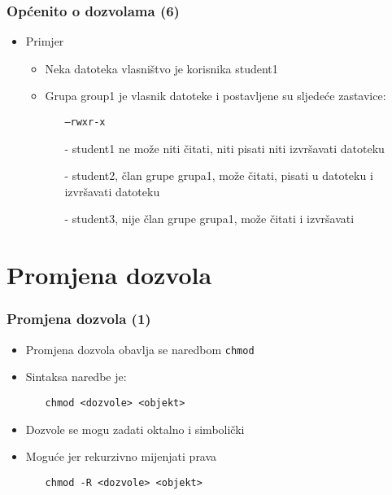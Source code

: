 \documentclass[table,usenames,dvipsnames]{beamer}
\newcommand{\shell}[1]{\texttt{#1}}
\begin{document}
\begin{frame}[t]
\frametitle{Općenito o dozvolama (6)}
\begin{itemize}
  \item Primjer
  \begin{itemize}
    \item Neka datoteka vlasništvo je korisnika student1
    \item Grupa group1 je vlasnik datoteke i postavljene su sljedeće 
          zastavice:
    \begin{itemize}
      \item[] \shell{---rwxr-x}
      \item[-] student1 ne može niti čitati, niti pisati niti izvršavati 
               datoteku
      \item[-] student2, član grupe grupa1, može čitati, pisati u datoteku
               i izvršavati datoteku
      \item[-] student3, nije član grupe grupa1, može čitati i izvršavati
    \end{itemize}
  \end{itemize}
\end{itemize}
\end{frame}

\section{Promjena dozvola}
\begin{frame}[t]
\frametitle{Promjena dozvola (1)}
\begin{itemize}
  \item Promjena dozvola obavlja se naredbom \shell{chmod}
  \item Sintaksa naredbe je:
  \begin{itemize}
    \item[] \shell{chmod <dozvole> <objekt>}
  \end{itemize}
  \item Dozvole se mogu zadati oktalno i simbolički
  \item Moguće jer rekurzivno mijenjati prava
  \begin{itemize}
    \item[] \shell{chmod -R <dozvole> <objekt>}
  \end{itemize}
\end{itemize}
\end{frame}
\end{document}
